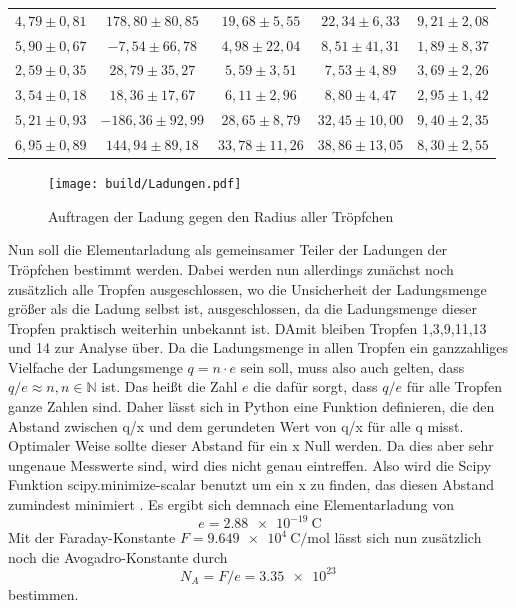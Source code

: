 \begin{table}[H]
\begin{tabular}{c c c c c }
        $4,79 \pm 0,81$ & $178,80 \pm 80,85$ & $19,68 \pm 5,55$ & $22,34 \pm 6,33$ & $9,21 \pm 2,08$ \\
        $5,90 \pm 0,67$ & $-7,54 \pm 66,78$ & $4,98 \pm 22,04$ & $8,51 \pm 41,31$ & $1,89 \pm 8,37$ \\
        $2,59 \pm 0,35$ & $28,79 \pm 35,27$ & $5,59 \pm 3,51$ & $7,53 \pm 4,89$ & $3,69 \pm 2,26$ \\
        $3,54 \pm 0,18$ & $18,36 \pm 17,67$ & $6,11 \pm 2,96$ & $8,80 \pm 4,47$ & $2,95 \pm 1,42$ \\
        $5,21 \pm 0,93$ & $-186,36 \pm 92,99$ & $28,65 \pm 8,79$ & $32,45 \pm 10,00$ & $9,40 \pm 2,35$ \\
        $6,95 \pm 0,89$ & $144,94 \pm 89,18$ & $33,78 \pm 11,26$ & $38,86 \pm 13,05$ & $8,30 \pm 2,55$ \\

        \bottomrule
    \end{tabular}
\end{table}

\begin{figure}[H]
    \centering
    \texttt{[image: build/Ladungen.pdf]}
    \caption{Auftragen der Ladung gegen den Radius aller Tröpfchen}
    \label{fig:Ladung}
  \end{figure}

  \noindent Nun soll die Elementarladung als gemeinsamer Teiler der Ladungen der Tröpfchen bestimmt werden.
  Dabei werden nun allerdings zunächst noch zusätzlich alle Tropfen ausgeschlossen, wo die Unsicherheit der Ladungsmenge 
  größer als die Ladung selbst ist, ausgeschlossen, da die Ladungsmenge dieser Tropfen praktisch weiterhin unbekannt ist.
  DAmit bleiben Tropfen 1,3,9,11,13 und 14 zur Analyse über. Da die Ladungsmenge in allen Tropfen ein ganzzahliges
  Vielfache der Ladungsmenge $q=n\cdot e$ sein soll, muss also auch gelten, dass $q/e\approx n, n \in \mathbb{N}$ ist.
  Das heißt die Zahl $e$ die dafür sorgt, dass $q/e$ für alle Tropfen ganze Zahlen sind. Daher lässt sich in Python eine
  Funktion definieren, die den Abstand zwischen q/x und dem gerundeten Wert von q/x für alle q misst. Optimaler Weise sollte dieser Abstand für ein
  x Null werden. Da dies aber sehr ungenaue Messwerte sind, wird dies nicht genau eintreffen. Also wird die Scipy Funktion scipy.minimize-scalar benutzt um ein x zu finden,
  das diesen Abstand zumindest minimiert \cite{scipy}. Es ergibt sich demnach eine Elementarladung von
  \begin{equation*}
    e=\qty{2.88e-19}{\coulomb}
  \end{equation*}
  Mit der Faraday-Konstante $F=\qty{9.649e4}{\coulomb\per\mol}$\cite{PhysikTabellen} lässt sich nun zusätzlich noch die Avogadro-Konstante
  durch
  \begin{equation*}
    N_A=F/e=\qty{3.35e23}{}
  \end{equation*}
  bestimmen.